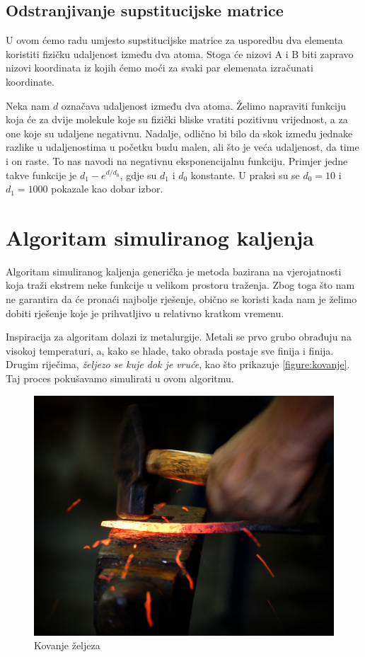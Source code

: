 \documentclass[times, utf8, zavrsni]{fer}
\begin{document}
\section{Odstranjivanje supstitucijske matrice}

U ovom ćemo radu umjesto supstitucijske matrice za usporedbu dva elementa
koristiti fizičku udaljenost između dva atoma. Stoga će nizovi A i B biti
zapravo nizovi koordinata iz kojih ćemo moći za svaki par elemenata
izračunati koordinate. 

Neka nam $d$ označava udaljenost između dva atoma. Želimo napraviti funkciju
koja će za dvije molekule koje su fizički bliske vratiti pozitivnu vrijednost,
a za one koje su udaljene negativnu. Nadalje, odlično bi bilo da skok
između jednake razlike u udaljenostima u početku budu malen, ali što
je veća udaljenost, da time i on raste.
To nas navodi na negativnu eksponencijalnu funkciju. Primjer jedne takve
funkcije je $d_1 - e^{d/d_0}$, gdje su $d_1$ i $d_0$ konstante. U praksi
su se $d_0 = 10$ i $d_1 = 1000$ pokazale kao dobar izbor. 




\chapter{Algoritam simuliranog kaljenja}
\label{chapter:SimuliranoKaljenje}
Algoritam simuliranog kaljenja generička je metoda bazirana na vjerojatnosti koja
traži ekstrem neke funkcije u velikom prostoru traženja. Zbog toga što nam ne
garantira da će pronaći najbolje rješenje, obično se koristi kada nam je
želimo dobiti rješenje koje je prihvatljivo u relativno kratkom
vremenu.

Inspiracija za algoritam dolazi iz metalurgije. Metali se prvo grubo obrađuju
na visokoj temperaturi, a, kako se hlade, tako obrada postaje sve finija
i  finija. Drugim riječima, \textit{željezo se kuje dok je vruće}, kao
što prikazuje \autoref{figure:kovanje}. 
Taj proces pokušavamo simulirati u ovom algoritmu.

\begin{figure}[h]
\centering
\includegraphics{res/Kovanje_zeljeza_l.jpg}
\caption[Kovanje željeza]{Kovanje željeza}
\label{figure:kovanje}
\end{figure}
\end{document}
